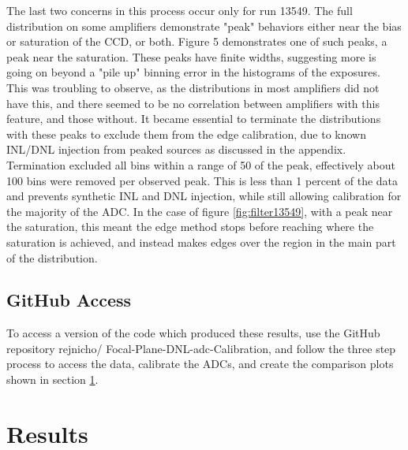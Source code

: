 \documentclass[11pt, letterpaper]{article}
\begin{document}
The last two concerns in this process occur only for run 13549.  
The full distribution on some amplifiers demonstrate "peak" behaviors either near the bias or saturation of the CCD, or both.
Figure 5 demonstrates one of such peaks, a peak near the saturation.  
These peaks have finite widths, suggesting more is going on beyond a "pile up" binning error in the histograms of the exposures. 
This was troubling to observe, as the distributions in most amplifiers did not have this, and there seemed to be no correlation between amplifiers with this feature, and those without. 
It became essential to terminate the distributions with these peaks to exclude them from the edge calibration, due to known INL/DNL injection from peaked sources as discussed in the appendix. 
Termination excluded all bins within a range of 50 of the peak, effectively about 100 bins were removed per observed peak. 
This is less than 1 percent of the data and prevents synthetic INL and DNL injection, while still allowing calibration for the majority of the ADC. 
In the case of figure \ref{fig:filter13549}, with a peak near the saturation, this meant the edge method stops before reaching where the saturation is achieved, and instead makes edges over the region in the main part of the distribution. 

\subsection{GitHub Access}
\label{sec: Git}
\indent 


To access a version of the code which produced these results, use the GitHub repository rejnicho/
Focal-Plane-DNL-adc-Calibration, and follow the three step process to access the data, calibrate the ADCs, and create the comparison plots shown in section \ref{sec:results}. 

\section{Results}
\label{sec:results}
\indent
\end{document}
